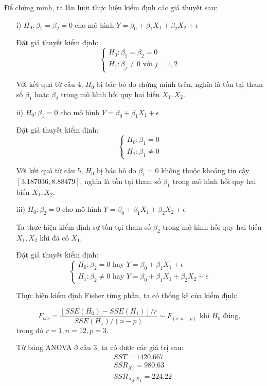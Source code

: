 \documentclass[a4paper]{article}
\theoremstyle{nonumberplain}
\begin{document}
Để chứng minh, ta lần lượt thực hiện kiểm định các giả thuyết sau:
\begin{enumerate}
	\item[i)] $H_0 : \beta_1 = \beta_2 = 0$ cho mô hình $Y = \beta_0 + \beta_1 X_1 + \beta_2 X_2 + \epsilon $
	
	Đặt giả thuyết kiểm định:
	\[\begin{cases}
		H_0 : \beta_1 = \beta_2 = 0 \\
		H_1: \beta_j \neq 0 \text{ với } j=1,2 
	\end{cases}\]

	Với kết quả từ câu 4, $H_0$ bị bác bỏ do chứng minh trên, nghĩa là tồn tại tham số $\beta_1$ hoặc $\beta_2$ trong mô hình hồi quy hai biến $X_1, X_2$.
	
	\item[ii)] $H_0 : \beta_1 = 0$ cho mô hình $Y = \beta_0 + \beta_1 X_1 + \epsilon $
	
	Đặt giả thuyết kiểm định:
	\[\begin{cases}
		H_0 : \beta_1 = 0 \\
		H_1: \beta_1 \neq 0
	\end{cases}\]

	Với kết quả từ câu 5, $H_0$ bị bác bỏ do $\beta_1 = 0$ không thuộc khoảng tin cậy $[3.187036,8.88479]$, nghĩa là tồn tại tham số $\beta_1$ trong mô hình hồi quy hai biến $X_1, X_2$.
	
	\item[iii)] $H_0 : \beta_2 = 0$ cho mô hình $Y = \beta_0 + \beta_1 X_1 + \beta_2 X_2 + \epsilon $
	
	Ta thực hiện kiểm định sự tồn tại tham số $\beta_2$ trong mô hình hồi quy hai biến $X_1, X_2$ khi đã có $X_1$.
	
	Đặt giả thuyết kiểm định:
	\[\begin{cases}
		H_0 : \beta_2 = 0 \text{ hay } Y = \beta_0 + \beta_1 X_1 + \epsilon \\
		H_1 : \beta_2 \ne 0 \text{ hay } Y = \beta_0 + \beta_1 X_1 + \beta_2 X_2 + \epsilon 
	\end{cases}\]
	
	Thực hiện kiểm định Fisher từng phần, ta có thống kê của kiểm định: 
	
	$$F_{obs} = \displaystyle \frac{\left [ SSE (H_0) - SSE(H_1) \right ] / r}{SSE(H_1)/(n-p)}  \sim F_{(r,n-p)} \text{ khi } H_0 \text{ đúng},$$
	trong đó $r = 1, n = 12, p = 3$.
	
	Từ bảng ANOVA ở câu 3, ta có được các giá trị sau:
	\begin{align*}
		&SST = 1420.667\\
		&SSR_{X_1} = 980.63\\
		&SSR_{X_2|X_1} = 224.22
	\end{align*}
	

\end{enumerate}
\end{document}
